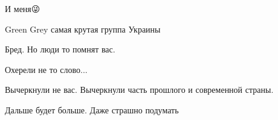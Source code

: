 \begin{itemize}
И меня😜

 
Green Grey самая крутая группа Украины 🤟🤟

 

Бред. Но люди то помнят вас.

Охерели не то слово...

Вычеркнули не вас. Вычеркнули часть прошлого и современной страны.

Дальше будет больше. Даже страшно подумать

\end{itemize}

